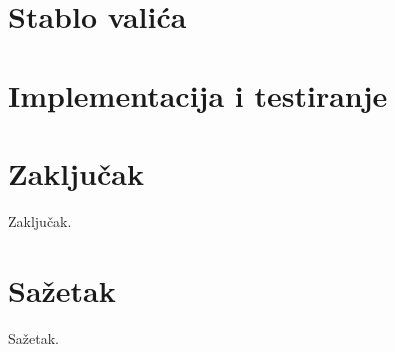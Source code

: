 \documentclass[times, utf8, seminar, numeric]{fer}
\begin{document}
\chapter{Stablo valića}

\chapter{Implementacija i testiranje}

\chapter{Zaključak}
Zaključak.




\chapter{Sažetak}
Sažetak.
\end{document}
